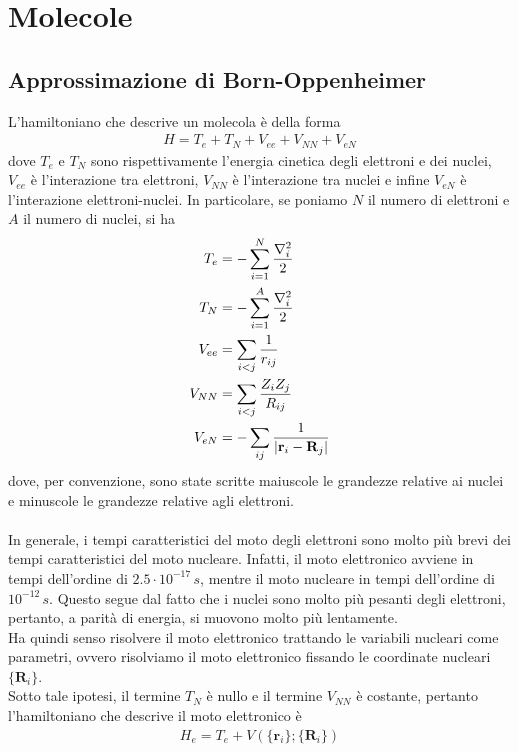 \documentclass{article}
\begin{document}
\newpage
\section{Molecole}
\subsection{Approssimazione di Born-Oppenheimer}
L'hamiltoniano che descrive un molecola è della forma 
\begin{align}
    H = T_e + T_N + V_{ee} + V_{NN} + V_{eN} \tag{3.1.1}
\end{align}
dove $T_e$ e $T_N$ sono rispettivamente l'energia cinetica degli elettroni e dei nuclei, $V_{ee}$ è l'interazione tra elettroni, $V_{NN}$ è l'interazione tra nuclei e infine $V_{eN}$ è l'interazione elettroni-nuclei. In particolare, se poniamo $N$ il numero di elettroni e $A$ il numero di nuclei, si ha 
\begin{align}
    T_e &= -\sum_{i = 1}^N \frac{\nabla^2_i}{2} \notag \\
    T_N &= -\sum_{i = 1}^A \frac{\nabla^2_i}{2} \notag \\
    V_{ee} &= \sum_{i < j} \frac{1}{r_{ij}} \notag \\
    V_{NN} &= \sum_{i < j} \frac{Z_iZ_j}{R_{ij}} \notag \\
    V_{eN} &= -\sum_{ij} \frac{1}{|\mathbf{r}_i - \mathbf{R}_j|} \notag
\end{align}
dove, per convenzione, sono state scritte maiuscole le grandezze relative ai nuclei e minuscole le grandezze relative agli elettroni. \\ \\
In generale, i tempi caratteristici del moto degli elettroni sono molto più brevi dei tempi caratteristici del moto nucleare. Infatti, il moto elettronico avviene in tempi dell'ordine di $2.5 \cdot 10^{-17} \, s$, mentre il moto nucleare in tempi dell'ordine di $10^{-12} \, s$. Questo segue dal fatto che i nuclei sono molto più pesanti degli elettroni, pertanto, a parità di energia, si muovono molto più lentamente. \\
Ha quindi senso risolvere il moto elettronico trattando le variabili nucleari come parametri, ovvero risolviamo il moto elettronico fissando le coordinate nucleari $\{\mathbf{R}_i\}$. \\
Sotto tale ipotesi, il termine $T_N$ è nullo e il termine $V_{NN}$ è costante, pertanto l'hamiltoniano che descrive il moto elettronico è 
\begin{align}
    H_e = T_e + V(\{\mathbf{r}_i\}; \{\mathbf{R}_i\}) \tag{3.1.2}
\end{align}
\end{document}
